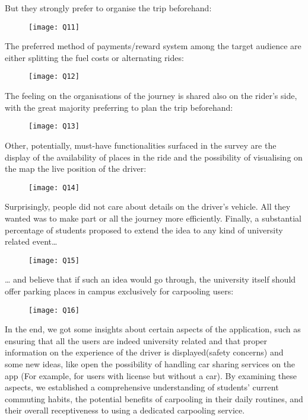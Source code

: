 \documentclass{article}
\begin{document}
But they strongly prefer to organise the trip beforehand:

\begin{figure}[htbp]
  \centering
     \texttt{[image: Q11]}
\end{figure}
\newpage

The preferred method of payments/reward system among the target audience are either splitting the fuel costs or alternating rides:

\begin{figure}[htbp]
  \centering
     \texttt{[image: Q12]}
\end{figure}

The feeling on the organisations of the journey is shared also on the rider’s side, with the great majority preferring to plan the trip beforehand:

\begin{figure}[htbp]
  \centering
     \texttt{[image: Q13]}
\end{figure}

Other, potentially, must-have functionalities surfaced in the survey are the display of the availability of places in the ride and the possibility of visualising on the map the live position of the driver: 

\begin{figure}[htbp]
  \centering
     \texttt{[image: Q14]}
\end{figure}

Surprisingly, people did not care about details on the driver’s vehicle. All they wanted was to make part or all the journey more efficiently. Finally,  \newline a substantial percentage of students proposed to extend the idea to any kind of university related event…

\begin{figure}[htbp]
  \centering
     \texttt{[image: Q15]}
\end{figure}

… and believe that if such an idea would go through, the university itself should offer parking places in campus exclusively for carpooling users:

\begin{figure}[htbp]
  \centering
     \texttt{[image: Q16]}
\end{figure}

In the end, we got some insights about certain aspects of the application, such as ensuring that all the users are indeed university related and that proper information on the experience of the driver is displayed(safety concerns) and some new ideas, like open the possibility of handling car sharing services on the app (For example, for users with license but without a car). By examining these aspects, we established a comprehensive understanding of students' current commuting habits, the potential benefits of carpooling in their daily routines, and their overall receptiveness to using a dedicated carpooling service. \newpage 
\end{document}

